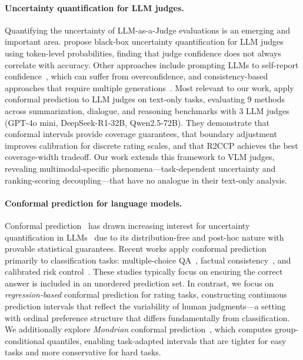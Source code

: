 \documentclass{article}
\begin{document}
\paragraph{Uncertainty quantification for LLM judges.}
Quantifying the uncertainty of LLM-as-a-Judge evaluations is an emerging and important area. \citet{wagner2024llmconfidence} propose black-box uncertainty quantification for LLM judges using token-level probabilities, finding that judge confidence does not always correlate with accuracy. Other approaches include prompting LLMs to self-report confidence~\citep{xiong2024selfconsistency}, which can suffer from overconfidence, and consistency-based approaches that require multiple generations~\citep{tian2023consistency}. Most relevant to our work, \citet{sheng2025analyzing} apply conformal prediction to LLM judges on text-only tasks, evaluating 9 methods across summarization, dialogue, and reasoning benchmarks with 3 LLM judges (GPT-4o mini, DeepSeek-R1-32B, Qwen2.5-72B). They demonstrate that conformal intervals provide coverage guarantees, that boundary adjustment improves calibration for discrete rating scales, and that R2CCP achieves the best coverage-width tradeoff. Our work extends this framework to VLM judges, revealing multimodal-specific phenomena---task-dependent uncertainty and ranking-scoring decoupling---that have no analogue in their text-only analysis.

\paragraph{Conformal prediction for language models.}
Conformal prediction~\citep{vovk2005algorithmic} has drawn increasing interest for uncertainty quantification in LLMs~\citep{campos2024conformal} due to its distribution-free and post-hoc nature with provable statistical guarantees. Recent works apply conformal prediction primarily to classification tasks: multiple-choice QA~\citep{kumar2023conformal,su2024api}, factual consistency~\citep{quach2024conformal,mohri2024language}, and calibrated risk control~\citep{angelopoulos2022conformal}. These studies typically focus on ensuring the correct answer is included in an unordered prediction set. In contrast, we focus on \emph{regression-based} conformal prediction for rating tasks, constructing continuous prediction intervals that reflect the variability of human judgments---a setting with ordinal preference structure that differs fundamentally from classification. We additionally explore \emph{Mondrian} conformal prediction~\citep{vovk2005algorithmic}, which computes group-conditional quantiles, enabling task-adapted intervals that are tighter for easy tasks and more conservative for hard tasks.
\end{document}
